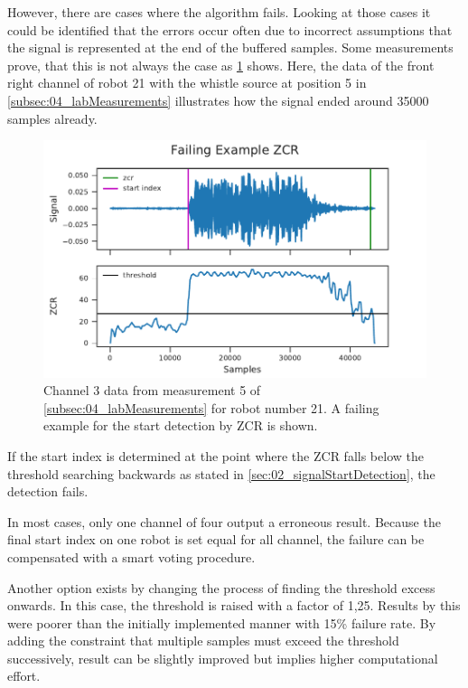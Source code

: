 However, there are cases where the algorithm fails.
Looking at those cases it could be identified that
the errors occur often due to incorrect assumptions that
the signal is represented at the end of the buffered
samples.
Some measurements prove, that this is not always the case as \cref{fig:04_zcrFail} shows.
Here, the data of the front right channel of robot 21 with the whistle source
at position 5 in \cref{subsec:04_labMeasurements}
illustrates how the signal ended around 35000 samples already.
\begin{figure}[ht]
	\centering
	\includegraphics[]{figures/evaluation/zcr_fail}
	\caption{Channel 3 data from measurement 5 of \cref{subsec:04_labMeasurements}
		for robot number 21. A failing example for the start detection by \ac{ZCR}
		is shown.}
	\label{fig:04_zcrFail}
\end{figure}
If the start index is determined at the point where the \ac{ZCR}
falls below the threshold searching backwards as stated in \cref{sec:02_signalStartDetection},
the detection fails.

In most cases, only one channel of four output a erroneous result.
Because the final start index on one robot is set equal for all channel,
the failure can be compensated with a smart voting procedure.

Another option exists by changing the process of finding the
threshold excess onwards.
In this case, the threshold is raised with a factor of 1,25.
Results by this were poorer than the initially implemented manner
with 15\si{\percent} failure rate.
By adding the constraint that multiple samples must exceed the
threshold successively, result can be slightly improved but implies higher
computational effort.

